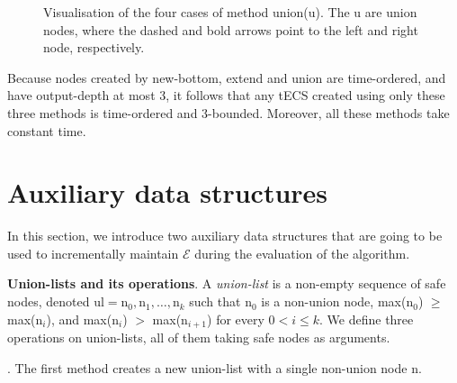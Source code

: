 \begin{figure}[t]
  \centering
  \begin{subfigure}[b]{0.15\linewidth}
    \centering
    \caption{}
    \label{fig:union:a}
  \end{subfigure}
  \hfill
  \begin{subfigure}[b]{0.15\linewidth}
    \centering
    \caption{}
    \label{fig:union:b}
  \end{subfigure}
  \hfill
  \begin{subfigure}[b]{0.3\linewidth}
    \centering
    \caption{}
    \label{fig:union:c}
  \end{subfigure}
  \hfill
  \begin{subfigure}[b]{0.3\linewidth}
    \centering
    \caption{}
    \label{fig:union:d}
  \end{subfigure}
  \caption{Visualisation of the four cases of method union(\textrm{u}). The \textrm{u} are union nodes, where the dashed and bold arrows point to the left and right node, respectively.}
  \label{fig:union}
\end{figure}

Because nodes created by new-bottom, extend and union are time-ordered, and have output-depth at most 3, it follows that any tECS created using only these three methods is time-ordered and 3-bounded. Moreover, all these methods take constant time.

\section{Auxiliary data structures}\label{sec:auxiliary_data_structure}

In this section, we introduce two auxiliary data structures that are going to be used to incrementally maintain $\mathcal{E}$ during the evaluation of the algorithm.

\textbf{Union-lists and its operations}. A \emph{union-list} is a non-empty sequence of safe nodes, denoted $\textrm{ul} = \textrm{n}_{0}, \textrm{n}_{1}, \ldots, \textrm{n}_{k}$ such that $\textrm{n}_{0}$ is a non-union node, max($\textrm{n}_{0}$) $\ge$ max($\textrm{n}_{i}$), and max($\textrm{n}_{i}$) $>$ max($\textrm{n}_{i+1}$) for every $0 < i \le k$. We define three operations on union-lists, all of them taking safe nodes as arguments.

. The first method creates a new union-list with a single non-union node \textrm{n}.

